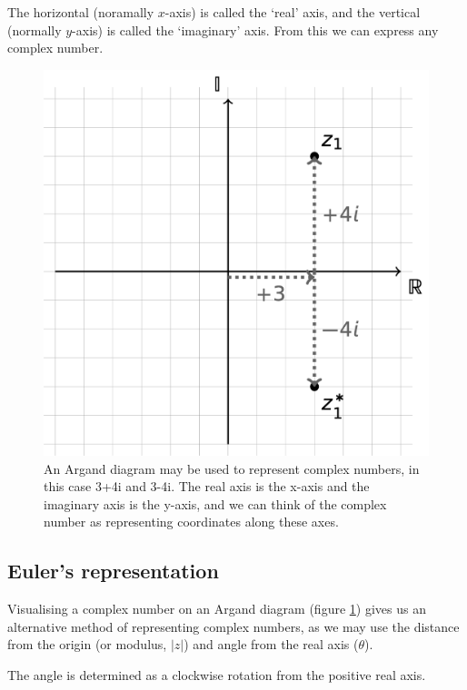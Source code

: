 \documentclass[
]{book}
\begin{document}
The horizontal (noramally \(x\)-axis) is called the `real' axis, and the vertical (normally \(y\)-axis) is called the `imaginary' axis. From this we can express any complex number.

\begin{figure}

{\centering \includegraphics[width=0.5\linewidth]{images/argand} 

}

\caption{An Argand diagram may be used to represent complex numbers, in this case 3+4i and 3-4i. The real axis is the x-axis and the imaginary axis is the y-axis, and we can think of the complex number as representing coordinates along these axes.}\label{fig:argand}
\end{figure}

\hypertarget{eulers-representation}{%
\subsection{Euler's representation}\label{eulers-representation}}

Visualising a complex number on an Argand diagram (figure \ref{fig:argand}) gives us an alternative method of representing complex numbers, as we may use the distance from the origin (or modulus, \(|z|\)) and angle from the real axis (\(\theta\)).

The angle is determined as a clockwise rotation from the positive real axis.
\end{document}
